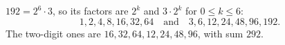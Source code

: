 $192=2^6\cdot3$, so its factors are $2^k$ and $3\cdot2^k$ for $0\le k\le6$:
\[1,2,4,8,16,32,64\quad\text{and}\quad3,6,12,24,48,96,192.\]
The two-digit ones are $16,32,64,12,24,48,96$, with sum $\boxed{292}$.

